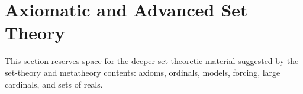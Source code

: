 \section{Axiomatic and Advanced Set Theory}

This section reserves space for the deeper set-theoretic material suggested by the set-theory and metatheory contents: axioms, ordinals, models, forcing, large cardinals, and sets of reals.









